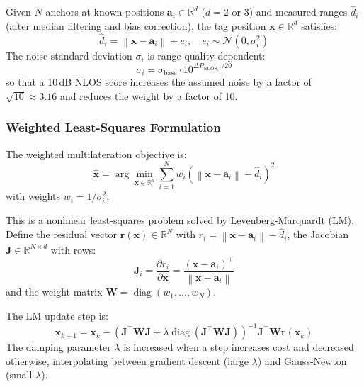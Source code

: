 \documentclass[11pt,a4paper]{article}
\newcommand{\vect}[1]{\bm{#1}}
\newcommand{\mat}[1]{\mathbf{#1}}
\newcommand{\norm}[1]{\left\|#1\right\|}
\newcommand{\Trans}{^{\top}}
\newcommand{\R}{\mathbb{R}}
\DeclareMathOperator{\diag}{diag}
\begin{document}
Given $N$ anchors at known positions $\vect{a}_i \in \R^d$ ($d = 2$ or $3$) and measured ranges $\hat{d}_i$ (after median filtering and bias correction), the tag position $\vect{x} \in \R^d$ satisfies:
\begin{equation}
\hat{d}_i = \norm{\vect{x} - \vect{a}_i} + e_i, \quad e_i \sim \mathcal{N}(0, \sigma_i^2)
\label{eq:measurement}
\end{equation}
The noise standard deviation $\sigma_i$ is range-quality-dependent:
\begin{equation}
\sigma_i = \sigma_\text{base} \cdot 10^{\Delta P_{\text{NLOS},i} / 20}
\label{eq:sigma}
\end{equation}
so that a 10\,dB NLOS score increases the assumed noise by a factor of $\sqrt{10} \approx 3.16$ and reduces the weight by a factor of 10.

\subsubsection{Weighted Least-Squares Formulation}

The weighted multilateration objective is:
\begin{equation}
\hat{\vect{x}} = \arg\min_{\vect{x} \in \R^d} \sum_{i=1}^{N} w_i \left(\norm{\vect{x} - \vect{a}_i} - \hat{d}_i\right)^2
\label{eq:wls}
\end{equation}
with weights $w_i = 1/\sigma_i^2$.

This is a nonlinear least-squares problem solved by Levenberg-Marquardt (LM). Define the residual vector $\vect{r}(\vect{x}) \in \R^N$ with $r_i = \norm{\vect{x} - \vect{a}_i} - \hat{d}_i$, the Jacobian $\mat{J} \in \R^{N \times d}$ with rows:
\begin{equation}
\mat{J}_i = \frac{\partial r_i}{\partial \vect{x}} = \frac{(\vect{x} - \vect{a}_i)\Trans}{\norm{\vect{x} - \vect{a}_i}}
\label{eq:jacobian}
\end{equation}
and the weight matrix $\mat{W} = \diag(w_1, \ldots, w_N)$.

The LM update step is:
\begin{equation}
\vect{x}_{k+1} = \vect{x}_k - \left(\mat{J}\Trans \mat{W} \mat{J} + \lambda \diag(\mat{J}\Trans \mat{W} \mat{J})\right)^{-1} \mat{J}\Trans \mat{W} \vect{r}(\vect{x}_k)
\label{eq:lm}
\end{equation}
The damping parameter $\lambda$ is increased when a step increases cost and decreased otherwise, interpolating between gradient descent (large $\lambda$) and Gauss-Newton (small $\lambda$).
\end{document}
